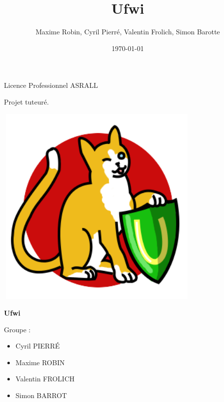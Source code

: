 \documentclass[12pt]{report}
\title{Ufwi}
\author{Maxime Robin, Cyril Pierré, Valentin Frolich, Simon Barotte}
\date{\today}
\begin{document}
\thispagestyle{empty}
\begin{center}
Licence Professionnel ASRALL


\vspace{1cm}
Projet tuteuré.

\vspace{2,5cm}

\begin{center}
  \includegraphics[width=10cm,height=10cm]{images/ufwi.png}
\end{center}

\vspace{1cm}
\textbf{\Huge Ufwi}


\end{center}

\vspace{4cm}

Groupe :
\begin{itemize}
  \item Cyril PIERRÉ
  \item Maxime ROBIN
  \item Valentin FROLICH
  \item Simon BARROT
\end{itemize}



\newpage

\renewcommand{\contentsname}{Sommaire}
\tableofcontents
\end{document}
